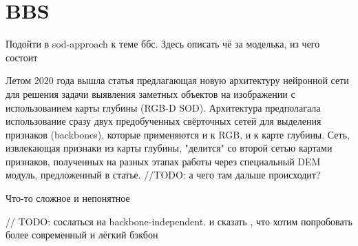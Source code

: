 \section{BBS}

Подойти в sod-approach к теме ббс. Здесь описать чё за моделька, из чего состоит

Летом 2020 года вышла статья \cite{BBS} предлагающая новую архитектуру нейронной сети для решения задачи выявления заметных объектов на изображении 
с использованием карты глубины (RGB-D SOD). Архитектура предполагала использование сразу двух предобученных свёрточных сетей
для выделения признаков (backbones), которые применяются и к RGB, и к карте глубины. Сеть, извлекающая признаки
из карты глубины, "делится" со второй сетью картами признаков, полученных на разных этапах работы через специальный DEM модуль, 
предложенный в статье.  //TODO: а чего там дальше происходит?

Что-то сложное и непонятное 




 // TODO: сослаться на backbone-independent. и сказать , что хотим попробовать более современный и лёгкий бэкбон